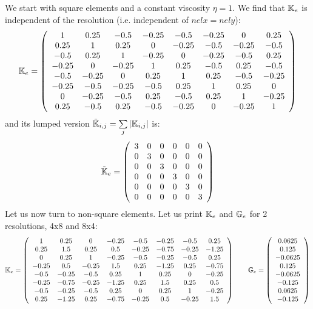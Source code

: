 We start with square elements and a constant viscosity $\eta=1$. We find that ${\mathbb{K}}_e$ 
is independent of the resolution (i.e. independent of $nelx=nely$):
\[
{\mathbb{K}}_e=
\left(
\begin{array}{cccccccc}
1    & 0.25 & -0.5 & -0.25 & -0.5  & -0.25 & 0     & 0.25 \\
0.25 & 1    & 0.25 & 0     & -0.25 & -0.5  & -0.25 & -0.5 \\
-0.5 & 0.25 & 1    & -0.25 &     0 & -0.25 & - 0.5 & 0.25 \\
-0.25 & 0 & -0.25 & 1 & 0.25 & -0.5 & 0.25 & -0.5 \\
-0.5 & -0.25 & 0 & 0.25 & 1 & 0.25 & -0.5 & -0.25 \\
-0.25 & -0.5 & -0.25 & -0.5 & 0.25 & 1 & 0.25 & 0 \\
0 & -0.25 & -0.5 & 0.25 & -0.5 & 0.25 & 1 & -0.25 \\
0.25 & -0.5 & 0.25 & -0.5 & -0.25 & 0 & -0.25 & 1 
\end{array}
\right)
\]
and its lumped version $\tilde{{\mathbb{K}}}_{i,j}=\sum\limits_j | {\mathbb{K}}_{i,j}|$ is:
\[
\tilde{{\mathbb{K}}}_e=
\left(
\begin{array}{cccccccc}
3 & 0 & 0 & 0 & 0 & 0 \\
0 & 3 & 0 & 0 & 0 & 0 \\
0 & 0 & 3 & 0 & 0 & 0 \\
0 & 0 & 0 & 3 & 0 & 0 \\
0 & 0 & 0 & 0 & 3 & 0 \\
0 & 0 & 0 & 0 & 0 & 3 
\end{array}
\right)
\]
Let us now turn to non-square elements. Let us print ${\mathbb{K}}_e$ and ${\mathbb{G}}_e$ for 2 resolutions, 4x8 and 8x4:
\[
{\mathbb{K}}_e=
\left(
\begin{array}{cccccccc}
 1&  0.25&  0& -0.25& -0.5& -0.25& -0.5&  0.25\\
 0.25&  1.5&  0.25&  0.5& -0.25& -0.75& -0.25& -1.25\\
 0&  0.25&  1& -0.25& -0.5& -0.25& -0.5&  0.25\\
-0.25&  0.5& -0.25&  1.5&  0.25& -1.25&  0.25& -0.75\\
-0.5& -0.25& -0.5&  0.25&  1&  0.25& 0& -0.25\\
-0.25& -0.75& -0.25& -1.25&  0.25&  1.5&  0.25&  0.5\\
-0.5& -0.25& -0.5&  0.25& 0&  0.25&  1& -0.25\\
 0.25& -1.25&  0.25& -0.75& -0.25&  0.5& -0.25&  1.5
\end{array}
\right)
\qquad
{\mathbb{G}}_e = 
\left(
\begin{array}{c}
 0.0625\\
 0.125\\
-0.0625\\
 0.125\\
-0.0625\\
-0.125\\
 0.0625\\
-0.125
\end{array}
\right)
\]
 

